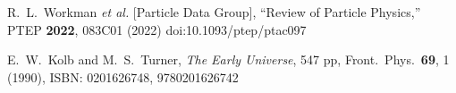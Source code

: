 \documentclass[Universe,article,submit,moreauthors,pdftex]{Definitions/mdpi}
\begin{document}

\begin{thebibliography}{99}

R.~L.~Workman \textit{et al.} [Particle Data Group],
``Review of Particle Physics,''
PTEP \textbf{2022}, 083C01 (2022)
doi:10.1093/ptep/ptac097

E.~W.~Kolb and M.~S.~Turner,
\emph{The Early Universe},
547 pp, Front.\ Phys.\ {\bf 69}, 1 (1990),
ISBN: 0201626748, 9780201626742


 


\end{thebibliography}

\end{document}
